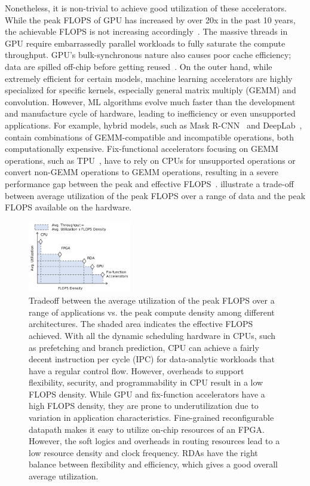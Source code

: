 Nonetheless, it is non-trivial to achieve good utilization of these accelerators.
While the peak FLOPS of GPU has increased by over 20x in the past 10 years, the achievable FLOPS is
not increasing accordingly~\cite{floptrend, gpuperfana}.
The massive threads in GPU require embarrassedly parallel workloads to fully saturate the compute
throughput. GPU's bulk-synchronous nature also causes poor cache efficiency; data are spilled
off-chip before getting reused~\cite{gpuinefficiency}.
On the outer hand, 
while extremely efficient for certain models, machine learning accelerators are highly
specialized for specific kernels, especially general matrix multiply (GEMM) and convolution.
However, ML algorithms evolve much faster than the development and manufacture cycle of hardware, 
leading to inefficiency or even unsupported applications.
For example, hybrid models, such as Mask R-CNN~\cite{maskrcnn} and DeepLab~\cite{deeplab}, contain
combinations of GEMM-compatible and incompatible operations, both computationally expensive.
Fix-functional accelerators focusing on GEMM operations, such as TPU~\cite{tpu}, 
have to rely on CPUs for unsupported operations or
convert non-GEMM operations to GEMM operations, resulting in a severe performance gap between the
peak and effective FLOPS~\cite{effflexdnnaccel}.
 illustrate a trade-off between average utilization of the peak FLOPS over a range
of data and the peak FLOPS available on the hardware.

\begin{figure}
\centering
\includegraphics[width=0.4\textwidth]{figs/peakutil.pdf}
\caption[Average utilization vs. peak compute density trade-off]{
 Tradeoff between the average utilization of the peak FLOPS over a range of applications vs. the peak compute density 
 among different architectures.
 The shaded area indicates the effective FLOPS achieved.
 With all the dynamic scheduling hardware in CPUs, such as prefetching and branch prediction, 
 CPU can achieve a fairly decent instruction per cycle (IPC) for data-analytic workloads that have a 
 regular control flow. 
 However, overheads to support flexibility, security, and programmability in CPU result in a low FLOPS
 density. 
 While GPU and fix-function accelerators have a high FLOPS density, they are prone to
 underutilization due to variation in application characteristics. 
 Fine-grained reconfigurable datapath makes it easy to utilize on-chip resources of an FPGA.
 However, the soft logics and overheads in routing resources lead to a low resource density and clock frequency.
 RDAs have the right balance between flexibility and efficiency, which gives a good overall average utilization.
}
\label{fig:peakutil}
\end{figure}

